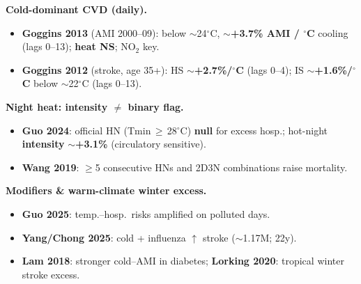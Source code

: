 \documentclass[11pt]{article}
\begin{document}
\begin{minipage}[t]{0.327\textwidth}
\begin{tcolorbox}[enhanced,colback=Panel,colframe=Teal!60,boxrule=0.8pt,arc=0pt,left=2.5mm,right=2.5mm,top=2.5mm,bottom=2.5mm,width=\linewidth,height=778mm,valign=top,before skip=0pt,after skip=0pt]
\begin{tcolorbox}
\textbf{Cold-dominant CVD (daily).}
\begin{itemize}
  \item \textbf{Goggins 2013} (AMI 2000--09): below $\sim$24$^\circ$C,
        $\sim$\textbf{+3.7\% AMI / $^\circ$C} cooling (lags 0--13); \textbf{heat NS}; NO$_2$ key.
  \item \textbf{Goggins 2012} (stroke, age 35+): HS $\sim$\textbf{+2.7\%/$^\circ$C} (lags 0--4);
        IS $\sim$\textbf{+1.6\%/$^\circ$C} below $\sim$22$^\circ$C (lags 0--13).
\end{itemize}
\textbf{Night heat: intensity $\neq$ binary flag.}
\begin{itemize}
  \item \textbf{Guo 2024}: official HN (Tmin\,$\geq$\,28$^\circ$C) \textbf{null} for excess hosp.;
        hot-night \textbf{intensity} $\sim$\textbf{+3.1\%} (circulatory sensitive).
  \item \textbf{Wang 2019}: $\geq$5 consecutive HNs and 2D3N combinations raise mortality.
\end{itemize}
\textbf{Modifiers \& warm-climate winter excess.}
\begin{itemize}
  \item \textbf{Guo 2025}: temp.--hosp.\ risks amplified on polluted days.
  \item \textbf{Yang/Chong 2025}: cold + influenza $\uparrow$ stroke ($\sim$1.17M; 22y).
  \item \textbf{Lam 2018}: stronger cold--AMI in diabetes; \textbf{Lorking 2020}: tropical winter stroke excess.
\end{itemize}

\end{tcolorbox}

\begin{tcolorbox}[enhanced,colback=Panel,colframe=Teal,boxrule=0.85pt,arc=1.2pt,left=6pt,right=6pt,top=4pt,bottom=4pt,coltitle=white,fonttitle=\bfseries\fontsize{12.5}{14}\selectfont,attach boxed title to top left={yshift=-1.5mm,xshift=3.5mm},boxed title style={colback=Teal,colframe=Teal,arc=1pt,boxrule=0pt,left=4.5pt,right=4.5pt,top=1pt,bottom=1pt},title={3. Mini evidence table (estimands not interchangeable)},before skip=0pt,after skip=1.5mm,width=\linewidth]
\RaggedRight\fontsize{9.8}{11.6}\selectfont


\end{tcolorbox}
\end{tcolorbox}
\end{minipage}
\end{document}
